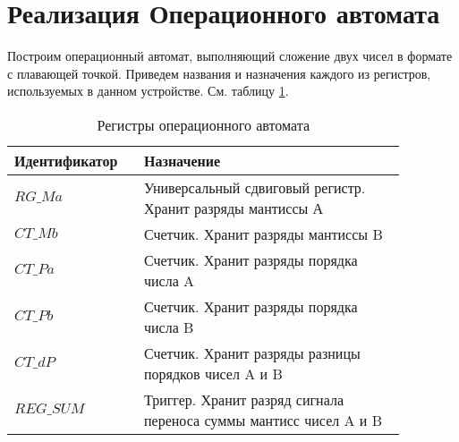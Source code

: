 \documentclass[a4paper,14pt]{extarticle}
\begin{document}
\section {Реализация Операционного автомата}
Построим операционный автомат, выполняющий сложение двух чисел в формате с плавающей точкой. Приведем названия и назначения каждого из регистров, используемых в данном устройстве. См. таблицу \ref{tab:regs}.
\begin{table}[h!]
	\centering
	\small
		\begin{tabular}{|m{0.27\linewidth}|m{0.6\linewidth}|}
			\hline
			\textbf{Идентификатор} & \textbf{Назначение} \\ \hline
			$RG\_Ma$ & Универсальный сдвиговый регистр. Хранит разряды мантиссы А\\ \hline
			$CT\_Mb$ & Счетчик. Хранит разряды мантиссы B\\ \hline
			$CT\_Pa$ & Счетчик. Хранит разряды порядка числа A \\\hline
			$CT\_Pb$ & Счетчик. Хранит разряды порядка числа B \\ \hline
			$CT\_dP$ & Счетчик. Хранит разряды разницы порядков чисел A и B\\ \hline
			$REG\_SUM$& Триггер. Хранит разряд сигнала переноса суммы мантисс чисел A и B\\\hline
		\end{tabular}
		\caption{Регистры операционного автомата}
		\label{tab:regs}
\end{table}
\end{document}
